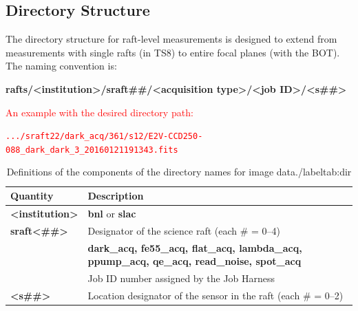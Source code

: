 \documentclass{article}[12pt]
\newcommand{\red}{\textcolor{red}}
\begin{document}
\subsection{Directory Structure}

The directory structure for raft-level measurements is designed to extend from measurements with single rafts (in TS8) to entire focal planes (with the BOT).  The naming convention is:

{\bf rafts/<institution>/sraft\#\#/<acquisition type>/<job ID>/<s\#\#>}

\red{An example with the desired directory path:}

\red{{\tt .../sraft22/dark\_acq/361/s12/E2V-CCD250-088\_dark\_dark\_3\_20160121191343.fits}}




\begin{table}
\begin{centering}
\begin{tabular}{| l | l |}
\hline
{\bf Quantity} & {\bf Description} \\
\hline
{\bf <institution>} & {\bf bnl} or {\bf slac} \\
{\bf sraft<\#\#>} & Designator of the science raft (each \# = 0--4) \\
{\bf <acquisition type>} & {\bf dark\_acq, fe55\_acq, flat\_acq, lambda\_acq, ppump\_acq, qe\_acq, read\_noise, spot\_acq} \\
{\bf <job ID>} & Job ID number assigned by the Job Harness \\
{\bf <s\#\#>} & Location designator of the sensor in the raft (each \# = 0--2) \\
\hline
\end{tabular}
\caption{Definitions of the components of the directory names for image data./label{tab:dir}}
\end{centering}
\end{table}
\end{document}
